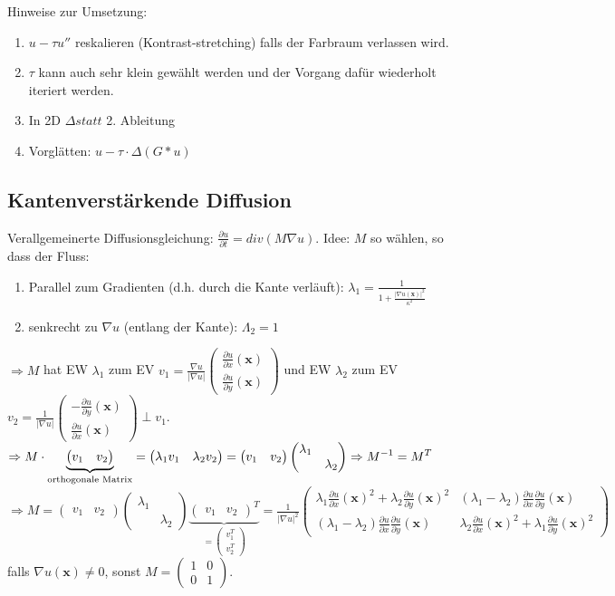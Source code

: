 \documentclass{article}
\theoremstyle{plain}
\theoremstyle{definition}
\numberwithin{equation}{section}
\newcommand{\abs}[1] {
\left| #1 \right|
}
\newcommand{\srmatrix}[1] {
\left( \begin{smallmatrix} #1 \end{smallmatrix} \right)
}
\newcommand{\C}[0]{
    \cdot
}
\newcommand{\x}[0] {
  \boldsymbol{x}
}
\newcommand{\mat}[1] {
\begin{pmatrix} #1 \end{pmatrix}
}
\begin{document}
            Hinweise zur Umsetzung:
            \begin{enumerate}[label=-]
                \item $u - \tau u''$ reskalieren (Kontrast-stretching) falls der Farbraum verlassen wird.
                \item $\tau$ kann auch sehr klein gewählt werden und der Vorgang dafür wiederholt iteriert werden.
                \item In 2D $\Delta statt$ 2. Ableitung
                \item Vorglätten: $u - \tau \C \Delta (G*u)$
            \end{enumerate}
        
            \subsection{Kantenverstärkende Diffusion}
                Verallgemeinerte Diffusionsgleichung: $\displaystyle \frac{\partial u}{\partial t} = div(M \nabla u)$.
                Idee: $M$ so wählen, so dass der Fluss:
                \begin{enumerate}[label=-]
                    \item Parallel zum Gradienten (d.h. durch die Kante verläuft): $\displaystyle \lambda_1=\frac{1}{1+\frac{\abs{\nabla u (\x)}^2}{\kappa^2}}$
                    \item senkrecht zu $\nabla u$ (entlang der Kante): $\Lambda_2=1$
                \end{enumerate}
        
                $\Rightarrow M$ hat EW $\lambda_1$ zum EV $\displaystyle v_1= \frac{\nabla u}{\abs{\nabla u}}\srmatrix{\frac{\partial u}{\partial x}(\x)\\\frac{\partial u}{\partial y}(\x)}$ und EW $\lambda_2$ zum EV $\displaystyle v_2 = \frac{1}{\abs{\nabla u}} \srmatrix{-\frac{\partial u}{\partial y}(\x)\\\frac{\partial u}{\partial x}(\x)} \perp v_1$.\\
                $\displaystyle \Rightarrow M \C \underbrace{\mat{v_1 & v_2}}_{\small \text{orthogonale Matrix}} = \mat{\lambda_1 v_1 & \lambda_2 v_2} = \mat{v_1 & v_2} \mat{\lambda_1 & \ \\ \ & \lambda_2} \Rightarrow M^{-1} = M^T$\\
                $\Rightarrow M= \mat{v_1 & v_2} \mat{\lambda_1 & \ \\ \ & \lambda_2} \underbrace{\mat{v_1 & v_2}^T}_{=\mat{v_1^T \\ v_2^T}} = \frac{1}{\abs{\nabla u}^2} \mat{\lambda_1 \frac{\partial u}{\partial x}(\x)^2 + \lambda_2 \frac{\partial u}{\partial y}(\x)^2  & (\lambda_1 - \lambda_2)\frac{\partial u}{\partial x} \frac{\partial u}{\partial y}(\x)\\ (\lambda_1 - \lambda_2)\frac{\partial u}{\partial x} \frac{\partial u}{\partial y}(\x) & \lambda_2 \frac{\partial u}{\partial x}(\x)^2 + \lambda_1 \frac{\partial u}{\partial y}(\x)^2}$\\
                falls $\nabla u(\x) \neq 0$, sonst $M= \mat{1 & 0 \\ 0 & 1}$.
        
\end{document}

